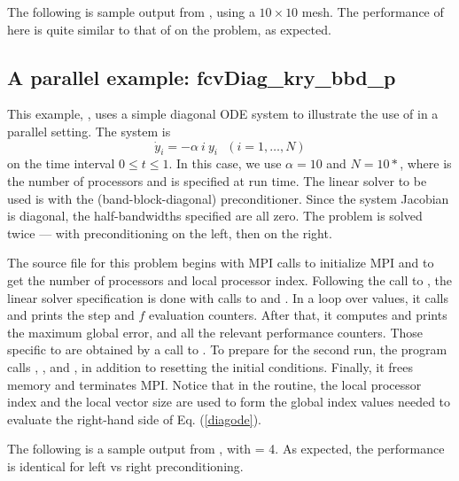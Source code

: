 The following is sample output from , using a $10 \times 10$ mesh.
The performance of {\fcvode} here is quite similar to that of {\cvode} on
the  problem, as expected.



\subsection{A parallel example: fcvDiag\_kry\_bbd\_p}\label{ss:fcvDiag_bbd_p}

This example, , uses a simple diagonal ODE system to illustrate
the use of {\fcvode} in a parallel setting.  The system is
\begin{equation} \label{diagode}
\dot{y}_i = - \alpha ~i~ y_i ~~~ (i = 1,\ldots, N)
\end{equation}
on the time interval $0 \leq t \leq 1$.  In this case, we use $\alpha = 10$
and $N = 10*$, where  is the number of processors
and is specified at run time.  The linear solver to be used is
{\spgmr} with the {\cvbbdpre} (band-block-diagonal) preconditioner.
Since the system Jacobian is diagonal, the half-bandwidths specified
are all zero.  The problem is solved twice --- with preconditioning on
the left, then on the right.

The source file for this problem begins with MPI calls to initialize
MPI and to get the number of processors and local processor index.
Following the call to , the linear solver specification is done with
calls to  and .  In a loop over 
values, it calls  and prints the step and $f$ evaluation counters.
After that, it computes and prints the maximum global error, and all the
relevant performance counters.  Those specific to {\cvbbdpre} are obtained
by a call to .  To prepare for the second run, the program
calls , , and , in addition
to resetting the initial conditions.  Finally, it frees memory and terminates MPI.
Notice that in the  routine, the local processor index 
and the local vector size  are used to form the global index
values needed to evaluate the right-hand side of Eq. (\ref{diagode}).

The following is a sample output from , with  = 4.
As expected, the performance is identical for left vs right preconditioning.


